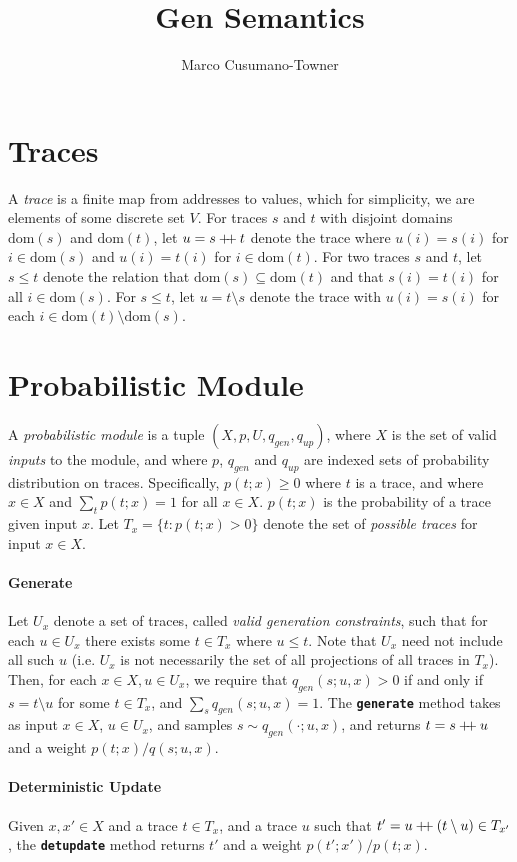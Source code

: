 \documentclass{article}
\title{Gen Semantics}
\author{Marco Cusumano-Towner}
\newcommand{\code}[1]{\texttt{\small{\textbf{#1}}}}
\newcommand\doubleplus{\mathbin{+\mkern-5mu+}}
\newcommand{\concat}[0]{\doubleplus}
\newcommand{\diff}[0]{\setminus}
\newcommand{\dom}[0]{\mbox{dom}}
\begin{document}
\maketitle

\section{Traces}
A \emph{trace} is a finite map from addresses to values, which for simplicity, we are elements of some discrete set $V$.
For traces $s$ and $t$ with disjoint domains $\dom(s)$ and $\dom(t)$, let $u = s \concat t$ denote the trace where $u(i) = s(i)$ for $i \in \dom(s)$ and $u(i) = t(i)$ for $i \in \dom(t)$.
For two traces $s$ and $t$, let $s \le t$ denote the relation that $\dom(s) \subseteq \dom(t)$ and that $s(i) = t(i)$ for all $i \in \dom(s)$.
For $s \le t$, let $u = t \diff s$ denote the trace with $u(i) = s(i)$ for each $i \in \dom(t) \setminus \dom(s)$.

\section{Probabilistic Module}
A \emph{probabilistic module} is a tuple $(X, p, U, q_{gen}, q_{up})$, where $X$ is the set of valid \emph{inputs} to the module, and where $p$, $q_{gen}$ and $q_{up}$ are indexed sets of probability distribution on traces.
Specifically, $p(t; x) \ge 0$ where $t$ is a trace, and where $x \in X$ and $\sum_t p(t; x) = 1$ for all $x \in X$.
$p(t; x)$ is the probability of a trace given input $x$.
Let $T_x = \{t : p(t; x) > 0 \}$ denote the set of \emph{possible traces} for input $x \in X$.

\paragraph{Generate}
Let $U_x$ denote a set of traces, called \emph{valid generation constraints}, such that for each $u \in U_x$ there exists some $t \in T_x$ where $u \le t$.
Note that $U_x$ need not include all such $u$ (i.e. $U_x$ is not necessarily the set of all projections of all traces in $T_x$).
Then, for each $x \in X, u \in U_x$, we require that $q_{gen}(s; u, x) > 0$ if and only if $s = t \diff u$ for some $t \in T_x$, and $\sum_s q_{gen}(s; u, x) = 1$.
The \code{generate} method takes as input $x \in X$, $u \in U_x$, and samples $s \sim q_{gen}(\cdot; u, x)$, and returns $t = s \concat u$ and a weight $p(t; x) / q(s; u, x)$.

\paragraph{Deterministic Update}
Given $x, x' \in X$ and a trace $t \in T_x$, and a trace $u$ such that $t' = u \concat (t \setminus u) \in T_{x'}$, the \code{detupdate} method returns $t'$ and a weight $p(t'; x') / p(t; x)$.
\end{document}
